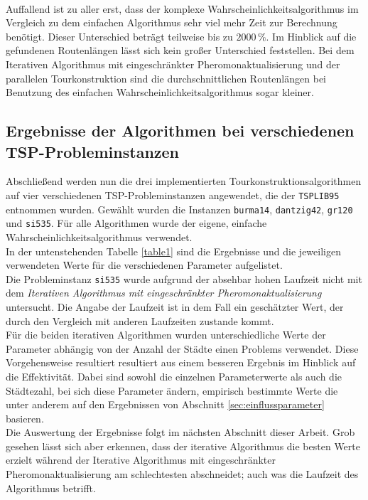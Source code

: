 \documentclass[doktyp=barbeit, sprache=german]{TUBAFarbeiten}
\begin{document}
\\Auffallend ist zu aller erst, dass der komplexe Wahrscheinlichkeitsalgorithmus im Vergleich zu dem einfachen Algorithmus sehr viel mehr Zeit zur Berechnung benötigt. Dieser Unterschied beträgt teilweise bis zu $2000 \,\%$.
Im Hinblick auf die gefundenen Routenlängen lässt  sich kein großer Unterschied feststellen. Bei dem Iterativen Algorithmus mit eingeschränkter Pheromonaktualisierung und der parallelen Tourkonstruktion sind die durchschnittlichen Routenlängen bei Benutzung des einfachen Wahrscheinlichkeitsalgorithmus sogar kleiner.
\subsection{Ergebnisse der Algorithmen bei verschiedenen TSP-Probleminstanzen}
Abschließend werden nun die drei implementierten Tourkonstruktionsalgorithmen auf vier verschiedenen TSP-Probleminstanzen angewendet, die der \texttt{TSPLIB95} entnommen wurden. Gewählt wurden die Instanzen \texttt{burma14}, \texttt{dantzig42}, \texttt{gr120} und \texttt{si535}. Für alle Algorithmen wurde der eigene, einfache Wahrscheinlichkeitsalgorithmus verwendet.
\\In der untenstehenden Tabelle \ref{table1} sind die Ergebnisse und die jeweiligen verwendeten Werte für die verschiedenen Parameter aufgelistet.
\\Die Probleminstanz \texttt{si535} wurde aufgrund der absehbar hohen Laufzeit nicht mit dem \textit{Iterativen Algorithmus mit eingeschränkter Pheromonaktualisierung} untersucht. Die Angabe der Laufzeit ist in dem Fall ein geschätzter Wert, der durch den Vergleich mit anderen Laufzeiten zustande kommt.
\\Für die beiden iterativen Algorithmen wurden unterschiedliche Werte der Parameter abhängig von der Anzahl der Städte einen Problems verwendet. Diese Vorgehensweise resultiert resultiert aus einem besseren Ergebnis im Hinblick auf die Effektivität. Dabei sind sowohl die einzelnen Parameterwerte als auch die Städtezahl, bei sich diese Parameter ändern, empirisch bestimmte Werte die unter anderem auf den Ergebnissen von Abschnitt \ref{sec:einflussparameter} basieren.
\\Die Auswertung der Ergebnisse folgt im nächsten Abschnitt dieser Arbeit. Grob gesehen lässt sich aber erkennen, dass der iterative Algorithmus die besten Werte erzielt während der Iterative Algorithmus mit eingeschränkter Pheromonaktualisierung am schlechtesten abschneidet; auch was die Laufzeit des Algorithmus betrifft.
\end{document}
